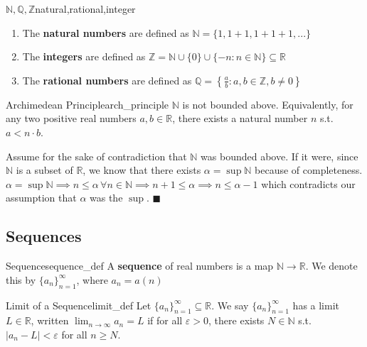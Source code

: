 \documentclass[11pt, letterpaper, openany]{book}
\renewenvironment{proof}[1][\proofname]{%
  \tcolorbox[blanker, breakable, left=1em,
    before skip=1em, after skip=1em,
    borderline west={2pt}{0pt}{MagicTeal!50},
    colback=MagicCream,
    before upper={\textcolor{MagicTeal}{\sffamily\bfseries #1.}\space}
  ]%
}{%
  \hfill\textcolor{MagicTeal}{\ensuremath{\blacksquare}}\endtcolorbox%
}
\begin{document}
\begin{defn}{$\mathbb{N,Q,Z}$}{natural,rational,integer}
    \begin{enumerate}
        \item The \textbf{natural numbers} are defined as $\mathbb{N}=\{1,1+1,1+1+1,...\}$
        \item The \textbf{integers} are defined as $\mathbb{Z}=\mathbb{N}\cup\{0\}\cup\{-n:n\in\mathbb{N}\}\subseteq{\mathbb{R}}$ 
        \item The \textbf{rational numbers} are defined as $\mathbb{Q}=\left\{\frac{a}{b}:a,b\in\mathbb{Z},b\neq{0}\right\}$
    \end{enumerate}
\end{defn}
\begin{thm}{Archimedean Principle}{arch_principle}
$\mathbb{N}$ is not bounded above. Equivalently, for any two positive real numbers $a,b\in\mathbb{R}$, there exists a natural number $n$ s.t. $a<n\cdot{b}$. 
\end{thm}
\begin{proof}
    Assume for the sake of contradiction that $\mathbb{N}$ was bounded above. If it were, since $\mathbb{N}$ is a subset of $\mathbb{R}$, we know that there exists $\alpha=\sup{\mathbb{N}}$ because of completeness. $\alpha=\sup{\mathbb{N}}\implies{n\leq{\alpha}}\,\forall{n}\in\mathbb{N}\implies{n+1}\leq\alpha\implies{n\leq{\alpha-1}}$ which contradicts our assumption that $\alpha$ was the $\sup$. 
\end{proof}

\subsection{Sequences}
\begin{defn}{Sequence}{sequence_def}
    A \textbf{sequence} of real numbers is a map $\mathbb{N}\to\mathbb{R}$. We denote this by $\{a_n\}^\infty_{n=1}$, where $a_n=a(n)$
\end{defn}
\begin{defn}{Limit of a Sequence}{limit_def}
Let $\{a_n\}^\infty_{n=1}\subseteq{\mathbb{R}}$. We say $\{a_n\}_{n=1}^\infty$ has a limit $L\in\mathbb{R}$, written $\lim_{n\to\infty}a_n=L$ if for all $\varepsilon>0$, there exists $N\in\mathbb{N}$ s.t. $|a_n-L|<\varepsilon$ for all $n\geq{N}$. 
\end{defn}
\end{document}
